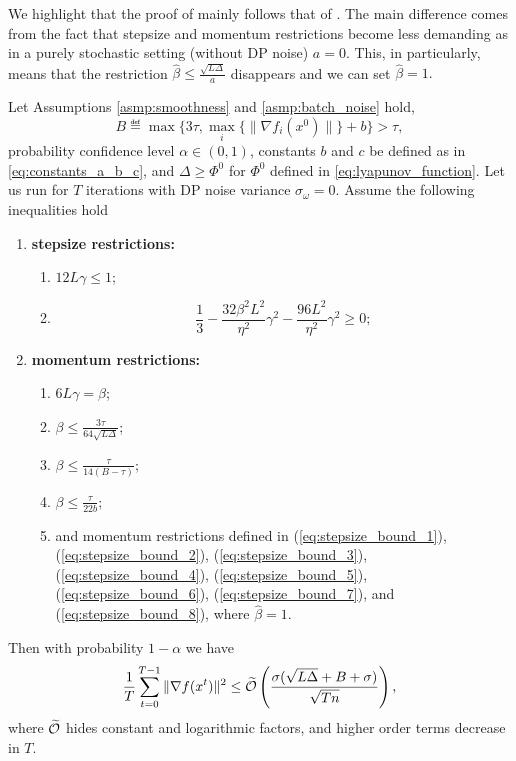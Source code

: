 \documentclass[a4paper,11pt]{article}
\begin{document}
We highlight that the proof of  mainly follows that of . The main difference comes from the fact that stepsize and momentum restrictions become less demanding as in a purely stochastic setting (without DP noise) $a=0$. This, in particularly, means that the restriction $\hat{\beta} \le \frac{\sqrt{L\Delta}}{a}$ disappears and we can set $\hat{\beta}=1.$


\begin{theorem}%
    Let Assumptions \ref{asmp:smoothness} and \ref{asmp:batch_noise} hold, $$B\eqdef\max\{3\tau, \max_i\{\|\nabla f_i(x^0)\|\}+b\} > \tau,$$ probability confidence level $\alpha\in(0,1)$, constants $b$ and $c$ be defined as in \eqref{eq:constants_a_b_c}, and $\Delta \ge \Phi^0$ for $\Phi^0$ defined in \eqref{eq:lyapunov_function}. Let us run  for $T$ iterations with DP noise variance $\sigma_{\omega} = 0$.
    Assume the following inequalities hold
    
    \begin{enumerate}
        \item {\bf stepsize restrictions:} 
        \begin{enumerate}[$i)$]
        \item $12L\gamma \le 1;$
        \item \[
        \frac{1}{3}
        - \frac{32\beta^2L^2}{\eta^2}\gamma^2 
        - \frac{96L^2}{\eta^2}\gamma^2 \ge 0;
        \]
        \end{enumerate}
        \item {\bf momentum restrictions:} 
        \begin{enumerate}[$i)$]
            \item $6L\gamma=\beta$;
        \item $\beta \le \frac{3\tau}{64\sqrt{L\Delta}}$;
        \item $\beta \le \frac{\tau}{14(B-\tau)};$
        \item $\beta \le \frac{\tau}{22b}$;
        \item and momentum restrictions defined in (\ref{eq:stepsize_bound_1}), (\ref{eq:stepsize_bound_2}), (\ref{eq:stepsize_bound_3}), (\ref{eq:stepsize_bound_4}), (\ref{eq:stepsize_bound_5}), (\ref{eq:stepsize_bound_6}), (\ref{eq:stepsize_bound_7}), and (\ref{eq:stepsize_bound_8}), where $\hat{\beta} =1$.
        \end{enumerate}
    \end{enumerate}
    Then with probability $1-\alpha$ we have 
   \begin{align*}
        \frac{1}{T}\sum_{t=0}^{T-1}\|\nabla f(x^t)\|^2 \le \widetilde{\mathcal O}\left(\frac{\sigma(\sqrt{L\Delta} + B+\sigma)}{\sqrt{Tn}}\right),
    \end{align*}
    where $\widetilde{\mathcal O}$ hides constant and logarithmic factors, and higher order terms decrease in $T$.
\end{theorem}
\end{document}
